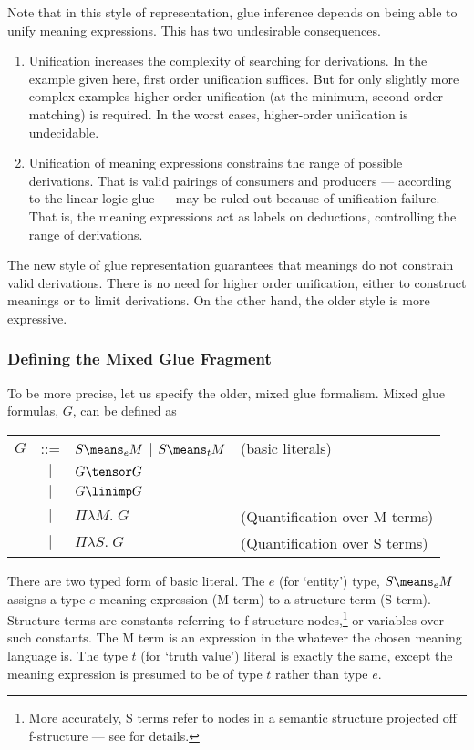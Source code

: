 Note that in this style of representation, glue inference
depends on being able to unify meaning expressions.  This has two
undesirable consequences.  
\begin{enumerate}
\item  Unification increases the complexity
of searching for derivations.  In the example given here, first order
unification suffices.  But for only slightly more complex examples
higher-order unification (at the minimum, second-order matching) is
required.  In the worst cases, higher-order unification is undecidable.
\item Unification of meaning expressions constrains the range of
possible derivations.  That is valid pairings of consumers and
producers --- according to the linear logic glue --- may be ruled out
because of unification failure.  That is, the meaning expressions
act as labels on deductions, controlling the range of derivations.
\end{enumerate}
The new style of glue representation guarantees that meanings do
not constrain valid derivations.  There is no need for higher order
unification, either to construct meanings or to limit derivations.
On the other hand, the older style is more expressive.

\subsubsection{Defining the Mixed Glue Fragment}

To be more precise, let us specify the older, mixed glue formalism.
Mixed glue formulas, $G$, can be defined as
\begin{center}
\begin{tabular}{lcll}
$G$ & ::=    & $S\means_e M$ $\mid$ $S\means_t M$ & (basic literals)\\
    & $\mid$ & $G\tensor G$ & \\
    & $\mid$ & $G\linimp G$ & \\
    & $\mid$ & $\Pi\lambda M.\; G$ & (Quantification over M terms)\\
    & $\mid$ & $\Pi\lambda S.\; G$ & (Quantification over S terms)
\end{tabular}
\end{center}
There are two typed form of basic  literal. The $e$ (for `entity') type,
$S\means_e M$ assigns a type $e$ meaning expression (M term) to a  
structure term (S term).  Structure terms are constants referring to
f-structure nodes,\footnote{More accurately, S terms
refer to nodes in a semantic structure projected off f-structure --- see
 for details.} or variables over such constants.
The M term is an expression  in the whatever
the chosen meaning language is.  The type $t$ (for `truth value')
literal is exactly the same, except the meaning expression is presumed
to be of type $t$ rather than type $e$.

